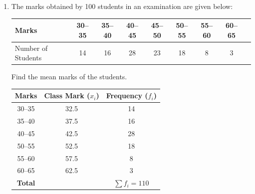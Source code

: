 \begin{enumerate}[label=\thesubsection.\arabic*, ref=\thesubsection.\theenumi]
	The two hemispherical ends combine to form a complete sphere of radius $r$:
	\begin{align*}
		V_{\text{ends}} &= 2 \times \left(\frac{2}{3}\pi r^3\right) = \frac{4}{3}\pi r^3 \\
		&= \frac{4}{3} \times \frac{22}{7} \times \left(\frac{7}{2}\right)^3 
		= \frac{4}{3} \times \frac{22}{7} \times \frac{343}{8} 
		= \frac{11 \times 49}{3} = \frac{539}{3} \approx 179.67\text{ cm}^3
	\end{align*}
	
	Summing the component volumes:
	\begin{align*}
		V_{\text{total}} &= V_{\text{cylinder}} + V_{\text{ends}} \\
		&= \frac{1001}{2} + \frac{539}{3} 
		= \frac{3003 + 1078}{6} 
		= \frac{4081}{6} = 680\frac{1}{6}\text{ cm}^3 \approx 680.17\text{ cm}^3
	\end{align*}
	
	
	\item The marks obtained by 100 students in an examination are given below:
	
	\begin{center}
		\begin{tabular}{|l|c|c|c|c|c|c|c|c|}
			\hline
			Marks & 30--35 & 35--40 & 40--45 & 45--50 &
			50--55 & 55--60 & 60--65\\
			\hline
			Number of Students & 14 & 16 & 28 & 23 & 18 & 8 & 3\\
			\hline
		\end{tabular}
	\end{center}
	Find the mean marks of the students.
	
	\solution
	
	\begin{center}
		\begin{tabular}{|c|c|c|}
			\hline
			\textbf{Marks} & \textbf{Class Mark ($x_i$)} & \textbf{Frequency ($f_i$)} \\
			\hline
			30--35 & 32.5 & 14 \\
			35--40 & 37.5 & 16 \\
			40--45 & 42.5 & 28 \\
			50--55 & 52.5 & 18 \\
			55--60 & 57.5 & 8  \\
			60--65 & 62.5 & 3  \\
			\hline
			\textbf{Total} & & $\sum f_i = 110$ \\
			\hline
		\end{tabular}
	\end{center}
	

\end{enumerate}
